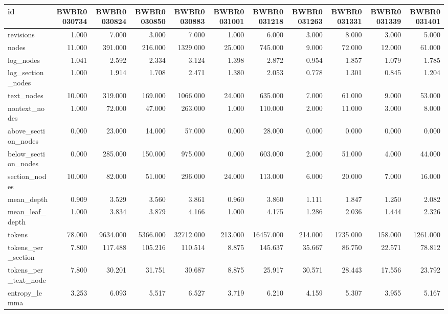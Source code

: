 \begin{tabular}{lrrrrrrrrrr}
\toprule
id & BWBR0030734 & BWBR0030824 & BWBR0030850 & BWBR0030883 & BWBR0031001 & BWBR0031218 & BWBR0031263 & BWBR0031331 & BWBR0031339 & BWBR0031401 \\
\midrule
revisions & 1.000 & 7.000 & 3.000 & 7.000 & 1.000 & 6.000 & 3.000 & 8.000 & 3.000 & 5.000 \\
\cline{1-11}
nodes & 11.000 & 391.000 & 216.000 & 1329.000 & 25.000 & 745.000 & 9.000 & 72.000 & 12.000 & 61.000 \\
\cline{1-11}
log\_nodes & 1.041 & 2.592 & 2.334 & 3.124 & 1.398 & 2.872 & 0.954 & 1.857 & 1.079 & 1.785 \\
\cline{1-11}
log\_section\_nodes & 1.000 & 1.914 & 1.708 & 2.471 & 1.380 & 2.053 & 0.778 & 1.301 & 0.845 & 1.204 \\
\cline{1-11}
text\_nodes & 10.000 & 319.000 & 169.000 & 1066.000 & 24.000 & 635.000 & 7.000 & 61.000 & 9.000 & 53.000 \\
\cline{1-11}
nontext\_nodes & 1.000 & 72.000 & 47.000 & 263.000 & 1.000 & 110.000 & 2.000 & 11.000 & 3.000 & 8.000 \\
\cline{1-11}
above\_section\_nodes & 0.000 & 23.000 & 14.000 & 57.000 & 0.000 & 28.000 & 0.000 & 0.000 & 0.000 & 0.000 \\
\cline{1-11}
below\_section\_nodes & 0.000 & 285.000 & 150.000 & 975.000 & 0.000 & 603.000 & 2.000 & 51.000 & 4.000 & 44.000 \\
\cline{1-11}
section\_nodes & 10.000 & 82.000 & 51.000 & 296.000 & 24.000 & 113.000 & 6.000 & 20.000 & 7.000 & 16.000 \\
\cline{1-11}
mean\_depth & 0.909 & 3.529 & 3.560 & 3.861 & 0.960 & 3.860 & 1.111 & 1.847 & 1.250 & 2.082 \\
\cline{1-11}
mean\_leaf\_depth & 1.000 & 3.834 & 3.879 & 4.166 & 1.000 & 4.175 & 1.286 & 2.036 & 1.444 & 2.326 \\
\cline{1-11}
tokens & 78.000 & 9634.000 & 5366.000 & 32712.000 & 213.000 & 16457.000 & 214.000 & 1735.000 & 158.000 & 1261.000 \\
\cline{1-11}
tokens\_per\_section & 7.800 & 117.488 & 105.216 & 110.514 & 8.875 & 145.637 & 35.667 & 86.750 & 22.571 & 78.812 \\
\cline{1-11}
tokens\_per\_text\_node & 7.800 & 30.201 & 31.751 & 30.687 & 8.875 & 25.917 & 30.571 & 28.443 & 17.556 & 23.792 \\
\cline{1-11}
entropy\_lemma & 3.253 & 6.093 & 5.517 & 6.527 & 3.719 & 6.210 & 4.159 & 5.307 & 3.955 & 5.167 \\

\end{tabular}
